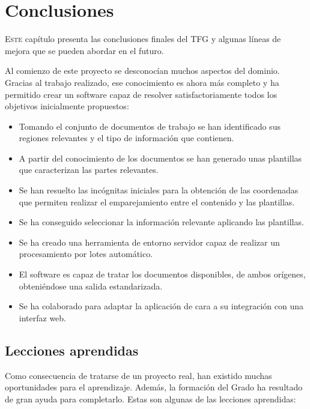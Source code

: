 
\chapter{Conclusiones}
\label{chap:conclusiones}

\lettrine{E}{ste} capítulo presenta las conclusiones finales del TFG y algunas líneas de mejora que se pueden abordar en el futuro.

Al comienzo de este proyecto se desconocían muchos aspectos del dominio. Gracias al trabajo realizado, ese conocimiento es ahora más completo y ha permitido crear un software capaz de resolver satisfactoriamente todos los objetivos inicialmente propuestos:

\begin{itemize}
	\item Tomando el conjunto de documentos de trabajo se han identificado sus regiones relevantes y el tipo de información que contienen.
	\item A partir del conocimiento de los documentos se han generado unas plantillas que caracterizan las partes relevantes.
	\item Se han resuelto las incógnitas iniciales para la obtención de las coordenadas que permiten realizar el emparejamiento entre el contenido y las plantillas.
	\item Se ha conseguido seleccionar la información relevante aplicando las plantillas.
	\item Se ha creado una herramienta de entorno servidor capaz de realizar un procesamiento por lotes automático.
	\item El software es capaz de tratar los documentos disponibles, de ambos orígenes, obteniéndose una salida estandarizada.
	\item Se ha colaborado para adaptar la aplicación de cara a su integración con una interfaz web.
\end{itemize}

\section{Lecciones aprendidas}

Como consecuencia de tratarse de un proyecto real, han existido muchas oportunidades para el aprendizaje. Además, la formación del Grado ha resultado de gran ayuda para completarlo. Estas son algunas de las lecciones aprendidas:

